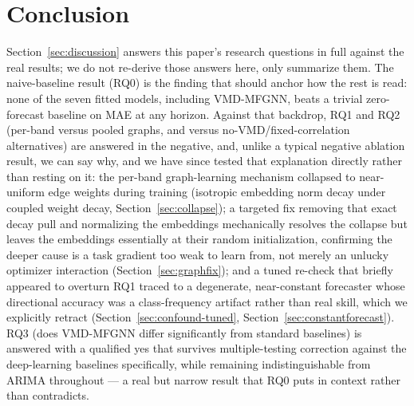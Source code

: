\documentclass[journal]{IEEEtran}
\begin{document}
\section{Conclusion}
\label{sec:conclusion}

Section~\ref{sec:discussion} answers this paper's research questions in full against the real results; we do not re-derive those answers here, only summarize them. The naive-baseline result (RQ0) is the finding that should anchor how the rest is read: none of the seven fitted models, including VMD-MFGNN, beats a trivial zero-forecast baseline on MAE at any horizon. Against that backdrop, RQ1 and RQ2 (per-band versus pooled graphs, and versus no-VMD/fixed-correlation alternatives) are answered in the negative, and, unlike a typical negative ablation result, we can say why, and we have since tested that explanation directly rather than resting on it: the per-band graph-learning mechanism collapsed to near-uniform edge weights during training (isotropic embedding norm decay under coupled weight decay, Section~\ref{sec:collapse}); a targeted fix removing that exact decay pull and normalizing the embeddings mechanically resolves the collapse but leaves the embeddings essentially at their random initialization, confirming the deeper cause is a task gradient too weak to learn from, not merely an unlucky optimizer interaction (Section~\ref{sec:graphfix}); and a tuned re-check that briefly appeared to overturn RQ1 traced to a degenerate, near-constant forecaster whose directional accuracy was a class-frequency artifact rather than real skill, which we explicitly retract (Section~\ref{sec:confound-tuned}, Section~\ref{sec:constantforecast}). RQ3 (does VMD-MFGNN differ significantly from standard baselines) is answered with a qualified yes that survives multiple-testing correction against the deep-learning baselines specifically, while remaining indistinguishable from ARIMA throughout --- a real but narrow result that RQ0 puts in context rather than contradicts.
\end{document}
